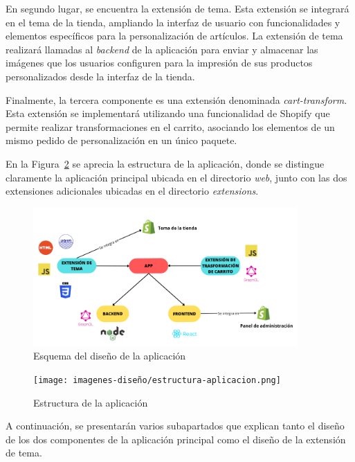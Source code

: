 \documentclass[12pt]{article}
\begin{document}
En segundo lugar, se encuentra la extensión de tema. Esta extensión se integrará en el tema de la tienda, 
ampliando la interfaz de usuario con funcionalidades y elementos específicos para la personalización de artículos. 
La extensión de tema realizará llamadas al \textit{backend} de la aplicación para enviar y almacenar las imágenes que los usuarios 
configuren para la impresión de sus productos personalizados desde la interfaz de la tienda.

Finalmente, la tercera componente es una extensión denominada \textit{cart-transform}. Esta extensión se implementará utilizando 
una funcionalidad de Shopify que permite realizar transformaciones en el carrito, asociando los elementos de un mismo 
pedido de personalización en un único paquete.

En la Figura~\ref{fig:esquemaAplicacionReal} se aprecia la estructura de la aplicación, donde se distingue claramente
la aplicación principal ubicada en el directorio \textit{web}, junto con las dos extensiones adicionales ubicadas en el directorio \textit{extensions}.

\begin{figure}[ht]
    \centering
    \includegraphics[width=0.9\textwidth]{imagenes-diseño/Esquema de diseño de la aplicación.png}
    \caption{\label{fig:esquemaAplicacion}Esquema del diseño de la aplicación}
    \vspace{\fill}
\end{figure}

\begin{figure}[ht]
    \centering
    \texttt{[image: imagenes-diseño/estructura-aplicacion.png]}
    \caption{\label{fig:esquemaAplicacionReal}Estructura de la aplicación}
    \vspace{\fill}
\end{figure}

A continuación, se presentarán varios subapartados que explican tanto el diseño de los dos componentes
de la aplicación principal como el diseño de la extensión de tema. 
\end{document}
